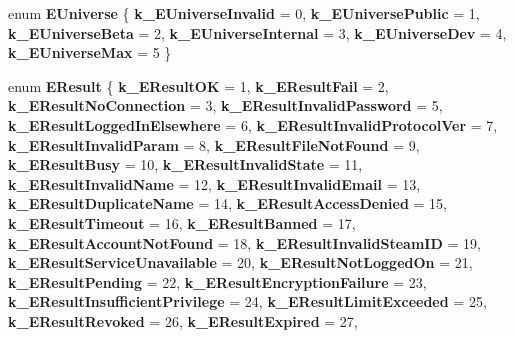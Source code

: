 \begin{DoxyCompactItemize}
\item 
\mbox{\label{namespace_valve_1_1_steamworks_a498395cc91a1c9e295c98188103538ea}} 
enum {\bfseries E\+Universe} \{ \newline
{\bfseries k\+\_\+\+E\+Universe\+Invalid} = 0, 
{\bfseries k\+\_\+\+E\+Universe\+Public} = 1, 
{\bfseries k\+\_\+\+E\+Universe\+Beta} = 2, 
{\bfseries k\+\_\+\+E\+Universe\+Internal} = 3, 
\newline
{\bfseries k\+\_\+\+E\+Universe\+Dev} = 4, 
{\bfseries k\+\_\+\+E\+Universe\+Max} = 5
 \}
\item 
\mbox{\label{namespace_valve_1_1_steamworks_ac9a06628ca2b4adbfebbcfb3a54c40ca}} 
enum {\bfseries E\+Result} \{ \newline
{\bfseries k\+\_\+\+E\+Result\+OK} = 1, 
{\bfseries k\+\_\+\+E\+Result\+Fail} = 2, 
{\bfseries k\+\_\+\+E\+Result\+No\+Connection} = 3, 
{\bfseries k\+\_\+\+E\+Result\+Invalid\+Password} = 5, 
\newline
{\bfseries k\+\_\+\+E\+Result\+Logged\+In\+Elsewhere} = 6, 
{\bfseries k\+\_\+\+E\+Result\+Invalid\+Protocol\+Ver} = 7, 
{\bfseries k\+\_\+\+E\+Result\+Invalid\+Param} = 8, 
{\bfseries k\+\_\+\+E\+Result\+File\+Not\+Found} = 9, 
\newline
{\bfseries k\+\_\+\+E\+Result\+Busy} = 10, 
{\bfseries k\+\_\+\+E\+Result\+Invalid\+State} = 11, 
{\bfseries k\+\_\+\+E\+Result\+Invalid\+Name} = 12, 
{\bfseries k\+\_\+\+E\+Result\+Invalid\+Email} = 13, 
\newline
{\bfseries k\+\_\+\+E\+Result\+Duplicate\+Name} = 14, 
{\bfseries k\+\_\+\+E\+Result\+Access\+Denied} = 15, 
{\bfseries k\+\_\+\+E\+Result\+Timeout} = 16, 
{\bfseries k\+\_\+\+E\+Result\+Banned} = 17, 
\newline
{\bfseries k\+\_\+\+E\+Result\+Account\+Not\+Found} = 18, 
{\bfseries k\+\_\+\+E\+Result\+Invalid\+Steam\+ID} = 19, 
{\bfseries k\+\_\+\+E\+Result\+Service\+Unavailable} = 20, 
{\bfseries k\+\_\+\+E\+Result\+Not\+Logged\+On} = 21, 
\newline
{\bfseries k\+\_\+\+E\+Result\+Pending} = 22, 
{\bfseries k\+\_\+\+E\+Result\+Encryption\+Failure} = 23, 
{\bfseries k\+\_\+\+E\+Result\+Insufficient\+Privilege} = 24, 
{\bfseries k\+\_\+\+E\+Result\+Limit\+Exceeded} = 25, 
\newline
{\bfseries k\+\_\+\+E\+Result\+Revoked} = 26, 
{\bfseries k\+\_\+\+E\+Result\+Expired} = 27, 

\end{DoxyCompactItemize}
